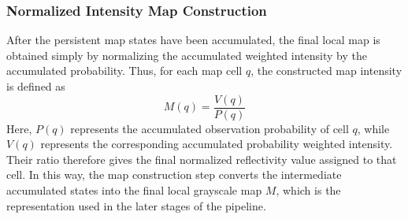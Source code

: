 \subsubsection{Normalized Intensity Map Construction}
After the persistent map states have been accumulated, the final local map is obtained simply by normalizing the accumulated weighted intensity by the accumulated probability. Thus, for each map cell $q$, the constructed map intensity is defined as
\begin{equation}
    M(q) = \frac{V(q)}{P(q)}
    \label{eq:local-map-generation-m}
\end{equation}
Here, $P(q)$ represents the accumulated observation probability of cell $q$, while $V(q)$ represents the corresponding accumulated probability weighted intensity. Their ratio therefore gives the final normalized reflectivity value assigned to that cell. In this way, the map construction step converts the intermediate accumulated states into the final local grayscale map $M$, which is the representation used in the later stages of the pipeline.



